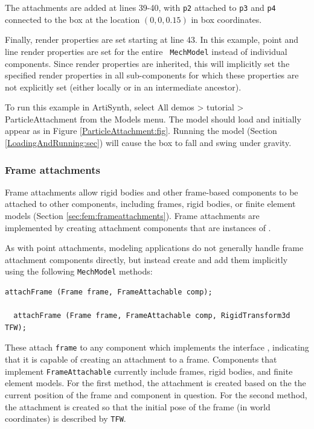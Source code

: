 The attachments are added at lines 39-40, with {\tt p2} attached to
{\tt p3} and {\tt p4} connected to the box at the location $(0, 0,
0.15)$ in box coordinates. 

Finally, render properties are set starting at line 43. In this
example, point and line render properties are set for the entire {\tt
MechModel} instead of individual components.  Since render properties
are inherited, this will implicitly set the specified render
properties in all sub-components for which these properties are not
explicitly set (either locally or in an intermediate ancestor).

To run this example in ArtiSynth, select {\sf All demos > tutorial >
ParticleAttachment} from the {\sf Models} menu. The model should load
and initially appear as in Figure \ref{ParticleAttachment:fig}.
Running the model (Section \ref{LoadingAndRunning:sec}) will cause the
box to fall and swing under gravity.

\subsubsection{Frame attachments}
\label{sec:mech:frameattachments}

Frame attachments allow rigid bodies and other frame-based components to
be attached to other components, including frames, rigid
bodies, or finite element models (Section \ref{sec:fem:frameattachments}).
Frame attachments are implemented by creating attachment components that are
instances of .

As with point attachments, modeling applications do not generally
handle frame attachment components directly, but instead create and
add them
implicitly using the following {\tt MechModel} methods:
%
\begin{lstlisting}[]
  attachFrame (Frame frame, FrameAttachable comp);

  attachFrame (Frame frame, FrameAttachable comp, RigidTransform3d TFW);
\end{lstlisting}
%
These attach {\tt frame} to any component which implements the
interface ,
indicating that it is capable of creating an attachment to a
frame. Components that implement {\tt FrameAttachable} currently
include frames, rigid bodies, and finite element models.  For the
first method, the attachment is created based on the the current
position of the frame and component in question. For the second
method, the attachment is created so that the initial pose of the frame
(in world coordinates) is described by {\tt TFW}.

